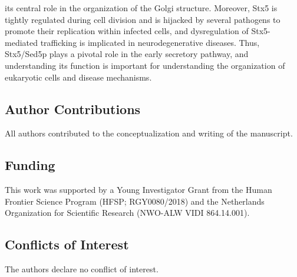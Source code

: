 its central role in the organization of the Golgi structure\cite{dascher_syntaxin_1994,suga_rna_2005,amessou_syntaxin_2007}. Moreover, Stx5 is tightly regulated during cell division\cite{huang_monoubiquitination_2016,uchiyama_p97p47-mediated_2005,rabouille_syntaxin_1998,diao_coordination_2008} and is hijacked by several pathogens to promote their replication within infected cells\cite{canton_disruption_2012,cruz_potent_2017,nonnenmacher_syntaxin_2015,canton_interactions_2012}, and dysregulation of Stx5-mediated trafficking is implicated in neurodegenerative diseases\cite{suga_syntaxin_2009,suga_syntaxin_2004,suga_syntaxin_2005}. Thus, Stx5/Sed5p plays a pivotal role in the early secretory pathway, and understanding its function is important for understanding the organization of eukaryotic cells and disease mechanisms.

\subsection{Author Contributions}

All authors contributed to the conceptualization and writing of the manuscript.

\subsection{Funding}

This work was supported by a Young Investigator Grant from the Human Frontier
Science Program (HFSP; RGY0080/2018) and the Netherlands Organization for
Scientific Research (NWO-ALW VIDI 864.14.001).

\subsection{Conflicts of Interest}

The authors declare no conflict of interest.
